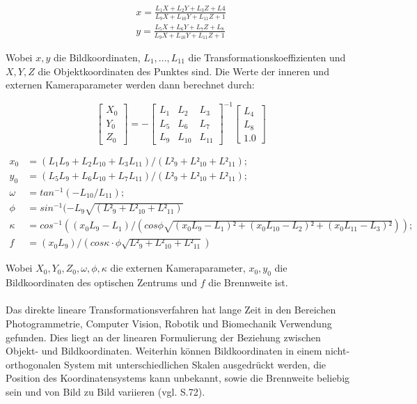 \begin{equation}
\begin{aligned}
x=\frac{L_1X+L_2Y+L_3Z+L4}{L_9X+L_{10}Y+L_{11}Z+1} \\
y=\frac{L_5X+L_6Y+L_7Z+L_8}{L_9X+L_{10}Y+L_{11}Z+1}
\end{aligned}
\end{equation}

Wobei $x,y$ die Bildkoordinaten, $L_1,...,L_{11}$ die Transformationskoeffizienten und $X,Y,Z$ die Objektkoordinaten des Punktes sind. Die Werte der inneren und externen Kameraparameter werden dann berechnet durch:

\begin{equation}
\begin{bmatrix}
X_0 \\ Y_0 \\ Z_0 
\end{bmatrix}
 = -
 \begin{bmatrix}
 L_1 & L_2 & L_3 \\
 L_5 & L_6 & L_7 \\
 L_9 & L_{10} & L_{11}
 \end{bmatrix}^{-1}
 \begin{bmatrix}
 L_4 \\ L_8 \\ 1.0
 \end{bmatrix}
 \end{equation}
 
 \begin{equation}
 \begin{aligned}
 x_0 &= (L_1L_9 + L_2L_{10} + L_3L_{11})/(L²_9 + L²_{10} + L²_{11}); \\
 y_0 &= (L_5L_9 + L_6L_{10} + L_7L_{11})/(L²_9 + L²_{10} + L²_{11}); \\
 \omega &= tan^{-1}(-L_{10}/L_{11}); \\
 \phi &= sin^{-1}(-L_9 \sqrt{(L²_9 + L²_{10} + L²_{11})} \\
  \kappa &= cos^{-1}((x_0L_9 - L_1)/(cos \phi \sqrt{(x_0L_9-L_1)² + (x_0L_{10}-L_2)² + (x_0L_{11}-L_3)²})); \\
 f&=(x_0L_9)/(cos \kappa \cdot \phi \sqrt{L²_9 + L²_{10} + L²_{11}}) 
 \end{aligned}
 \end{equation}

Wobei $X_0,Y_0,Z_0,\omega ,\phi , \kappa $ die externen Kameraparameter, $x_0,y_0$ die Bildkoordinaten des optischen Zentrums und $f$ die Brennweite ist. \\ \\Das direkte lineare Transformationsverfahren hat lange Zeit in den Bereichen Photogrammetrie, Computer Vision, Robotik und Biomechanik Verwendung gefunden. Dies liegt an der linearen Formulierung der Beziehung zwischen Objekt- und Bildkoordinaten. Weiterhin können Bildkoordinaten in einem nicht-orthogonalen System mit unterschiedlichen Skalen ausgedrückt werden, die Position des Koordinatensystems kann unbekannt, sowie die Brennweite beliebig sein und von Bild zu Bild variieren (vgl. \cite{dlt} S.72).

